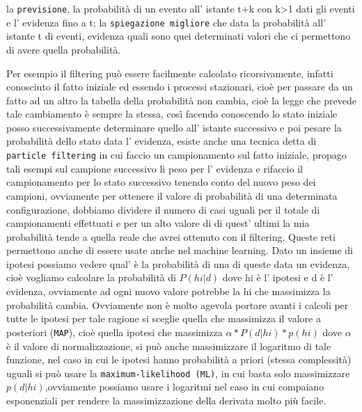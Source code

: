 		la \texttt{previsione}, la probabilità di un evento all' istante t+k con k>1 dati gli eventi e l' evidenza fino a t;
		la \texttt{spiegazione migliore} che data la probabilità all' istante t di eventi, evidenza quali sono quei determinati valori che ci permettono di avere quella probabilità.
		\par 
		Per esempio il filtering può essere facilmente calcolato ricorsivamente, infatti conosciuto il fatto iniziale ed essendo i processi stazionari, cioè per passare da un fatto ad un altro la tabella della probabilità non cambia, cioè la legge che prevede tale cambiamento è sempre la stessa, così facendo conoscendo lo stato iniziale posso successivamente determinare quello all' istante successivo e poi pesare la probabilità dello stato data l' evidenza, esiste anche una tecnica detta di \texttt{particle filtering} in cui faccio un campionamento sul fatto iniziale, propago tali esempi sul campione successivo li peso per l' evidenza e rifaccio il campionamento per lo stato successivo tenendo conto del nuovo peso dei campioni, ovviamente per ottenere il valore di probabilità di una determinata configurazione, dobbiamo dividere il numero di casi uguali per il totale di campionamenti effettuati e per un alto valore di di quest' ultimi la mia probabilità tende a quella reale che avrei ottenuto con il filtering. Queste reti permettono anche di essere usate anche nel machine learning. Dato un insieme di ipotesi possiamo vedere qual' è la probabilità di una di queste data un evidenza, cioè vogliamo calcolare la probabilità di $P(hi|d)$ dove hi è l' ipotesi e d è l' evidenza, ovviamente ad ogni nuovo valore potrebbe la hi che massimizza la probabilità cambia. Ovviamente non è molto agevola portare avanti i calcoli per tutte le ipotesi per tale ragione si sceglie quella che massimizza il valore a posteriori (\texttt{MAP}), cioè quella ipotesi che massimizza $\alpha*P(d|hi)*p(hi)$ dove $\alpha$ è il valore di normalizzazione, si può anche massimizzare il logaritmo di tale funzione, nel caso in cui le ipotesi hanno probabilità a priori (stessa complessità) uguali si può usare la \texttt{maximum-likelihood (ML)}, in cui basta solo massimizzare $p(d|hi)$,ovviamente possiamo usare i logaritmi nel caso in cui compaiano esponenziali per rendere la massimizzazione della derivata molto più facile.
		
